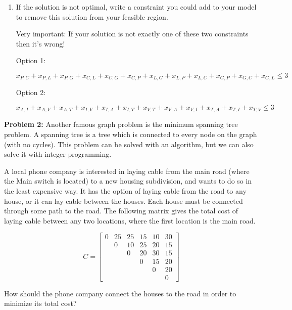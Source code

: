 \documentclass[11pt]{article}
\theoremstyle{definition}
\newcommand{\blu}{\color{blue}}
\begin{document}
\begin{enumerate}
\begin{enumerate}
{	}
	\item If the solution is not optimal, write a constraint you could add to your model to remove this solution from your feasible region.
{\blu
Very important: If your solution is not exactly one of these two constraints then it's wrong!

Option 1:

\[
x_{P,C}+x_{P,L}+x_{P,G}+x_{C,L}+x_{C,G}+x_{C,P} + x_{L,G}+x_{L,P}+x_{L,C}+x_{G,P}+x_{G,C}+x_{G,L} \leq 3
\]

Option 2:

\[
x_{A,I}+x_{A,V}+x_{A,T}+x_{I,V}+x_{I,A}+x_{I,T} + x_{V,T}+x_{V,A}+x_{V,I}+x_{T,A}+x_{T,I}+x_{T,V} \leq 3
\]

}
	
	
	\end{enumerate}
\end{enumerate}

\newpage

\textbf{Problem 2:} Another famous graph problem is the minimum spanning tree problem. A spanning tree is a tree which is connected to every node on the graph (with no cycles). This problem can be solved with an algorithm, but we can also solve it with integer programming.

A local phone company is interested in laying cable from the main road (where the
Main switch is located) to a new housing subdivision, and wants to do so in the least
expensive way.  It has the option of laying cable from the road to any house, or it can 
lay cable between the houses.  Each house must be connected through some path to 
the road.  The following matrix gives the total cost of laying cable between any two
locations, where the first location is the main road.

\[
C = 
\begin{bmatrix}
0 & 25 & 25 & 15 & 10 & 30 \\
  & 0  & 10 & 25 & 20 & 15 \\
  &    & 0  & 20 & 30 & 15 \\
  &    &    & 0  & 15 & 20 \\
  &    &    &    &  0 & 20 \\
  &    &    &    &    & 0
\end{bmatrix}
\]

How should the phone company connect the houses to the road in order to minimize its
total cost?
\end{document}
